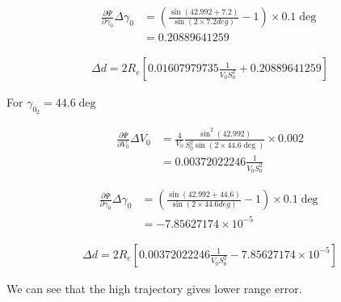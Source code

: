 \begin{equation}
    \begin{split}
    \frac{\partial \Psi}{\partial \gamma_0} \Delta \gamma_0 &= (\frac{\sin(42.992+7.2)}{\sin(2\times 7.2 deg)} - 1) \times 0.1 \deg \\
    &= 0.20889641259
    \end{split}
\end{equation}

\begin{equation}
    \begin{split}
        \Delta d = 2 R_e [0.01607979735 \frac{1}{V_0 S_0^2} + 0.20889641259] 
    \end{split}
\end{equation}

For $\gamma_0_2 = 44.6\deg$

\begin{equation}
    \begin{split}
        \frac{\partial \Psi }{\partial V_0} \Delta V_0 &= \frac{4}{V_0} \frac{\sin^2(42.992)}{S_0^2 \sin(2\times 44.6 \deg)} \times 0.002\\
        &= 0.00372022246 \frac{1}{V_0 S_0^2}
    \end{split}
\end{equation}

\begin{equation}
    \begin{split}
    \frac{\partial \Psi}{\partial \gamma_0} \Delta \gamma_0 &= (\frac{\sin(42.992+44.6)}{\sin(2\times 44.6 deg)} - 1) \times 0.1 \deg \\
    &= -7.85627174 \times 10^{-5}
    \end{split}
\end{equation}

\begin{equation}
    \begin{split}
        \Delta d = 2 R_e [0.00372022246 \frac{1}{V_0 S_0^2} -7.85627174\times 10^{-5}] 
    \end{split}
\end{equation}

We can see that the high trajectory gives lower range error.
